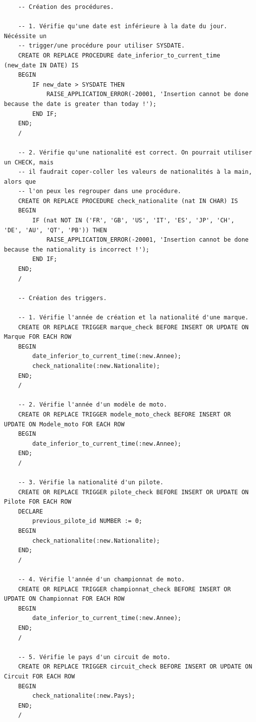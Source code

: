 \documentclass[12pt,a4paper]{article}
\newenvironment{code}{\captionsetup{type=listing}}{}
\begin{document}
\begin{code}
    \begin{verbatim}
    -- Création des procédures.

    -- 1. Vérifie qu'une date est inférieure à la date du jour. Nécéssite un
    -- trigger/une procédure pour utiliser SYSDATE.
    CREATE OR REPLACE PROCEDURE date_inferior_to_current_time (new_date IN DATE) IS
    BEGIN
        IF new_date > SYSDATE THEN
            RAISE_APPLICATION_ERROR(-20001, 'Insertion cannot be done because the date is greater than today !');
        END IF;
    END;
    /

    -- 2. Vérifie qu'une nationalité est correct. On pourrait utiliser un CHECK, mais
    -- il faudrait coper-coller les valeurs de nationalités à la main, alors que
    -- l'on peux les regrouper dans une procédure.
    CREATE OR REPLACE PROCEDURE check_nationalite (nat IN CHAR) IS
    BEGIN
        IF (nat NOT IN ('FR', 'GB', 'US', 'IT', 'ES', 'JP', 'CH', 'DE', 'AU', 'QT', 'PB')) THEN
            RAISE_APPLICATION_ERROR(-20001, 'Insertion cannot be done because the nationality is incorrect !');
        END IF;
    END;
    /

    -- Création des triggers.

    -- 1. Vérifie l'année de création et la nationalité d'une marque.
    CREATE OR REPLACE TRIGGER marque_check BEFORE INSERT OR UPDATE ON Marque FOR EACH ROW
    BEGIN
        date_inferior_to_current_time(:new.Annee);
        check_nationalite(:new.Nationalite);
    END;
    /

    -- 2. Vérifie l'année d'un modèle de moto.
    CREATE OR REPLACE TRIGGER modele_moto_check BEFORE INSERT OR UPDATE ON Modele_moto FOR EACH ROW
    BEGIN
        date_inferior_to_current_time(:new.Annee);
    END;
    /

    -- 3. Vérifie la nationalité d'un pilote.
    CREATE OR REPLACE TRIGGER pilote_check BEFORE INSERT OR UPDATE ON Pilote FOR EACH ROW
    DECLARE
        previous_pilote_id NUMBER := 0;
    BEGIN
        check_nationalite(:new.Nationalite);
    END;
    /

    -- 4. Vérifie l'année d'un championnat de moto.
    CREATE OR REPLACE TRIGGER championnat_check BEFORE INSERT OR UPDATE ON Championnat FOR EACH ROW
    BEGIN
        date_inferior_to_current_time(:new.Annee);
    END;
    /

    -- 5. Vérifie le pays d'un circuit de moto.
    CREATE OR REPLACE TRIGGER circuit_check BEFORE INSERT OR UPDATE ON Circuit FOR EACH ROW
    BEGIN
        check_nationalite(:new.Pays);
    END;
    /


\end{verbatim}
\end{code}
\end{document}
